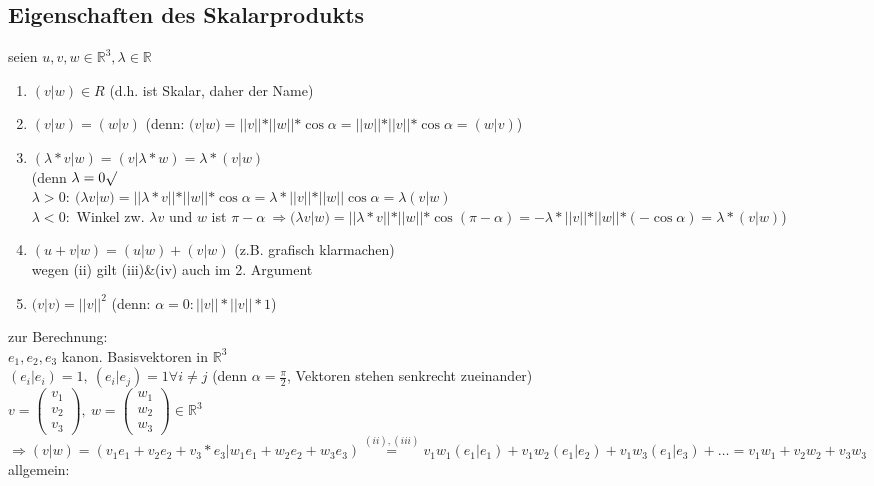\subsection{Eigenschaften des Skalarprodukts}
seien $u,v,w \in \mathbb{R}^3, \lambda\in \mathbb{R}$
\begin{enumerate}
	\item $(v|w)\in R$ (d.h. ist Skalar, daher der Name)
	\item $(v|w)=(w|v)$ (denn: $(v|w)=||v||*||w||*\cos \alpha = ||w||*||v||*\cos\alpha = (w|v)$)
	\item $(\lambda*v|w)=(v|\lambda*w) = \lambda*(v|w)$\\
	(denn $\lambda=0 \surd$\\
	$\lambda >0: \ (\lambda v|w)=||\lambda*v||*||w||*\cos \alpha=\lambda*||v||*||w||\cos\alpha = \lambda(v|w)$\\
	$\lambda <0:$ Winkel zw. $\lambda v$ und $w$ ist $\pi -\alpha \ \Rightarrow (\lambda v|w)=||\lambda*v||*||w||*\cos(\pi-\alpha) = -\lambda*||v||*||w||*(-\cos \alpha) = \lambda*(v|w)$)
	\item $(u+v|w)=(u|w)+(v|w)$ (z.B. grafisch klarmachen)\\
	wegen (ii) gilt (iii)\&(iv) auch im 2. Argument
	
	\item $(v|v)=||v||^2$ (denn: $\alpha =0: ||v||*||v||*1$)
\end{enumerate}
zur Berechnung:\\
$e_1,e_2,e_3$ kanon. Basisvektoren in $\mathbb{R}^3$\\
$(e_i|e_i)=1, \ (e_i|e_j)=1 \forall i\neq j$ (denn $\alpha=\frac{\pi}{2}$, Vektoren stehen senkrecht zueinander)\\
$v=\begin{pmatrix}v_1 \\ v_2 \\ v_3\end{pmatrix}, \ w=\begin{pmatrix}w_1 \\ w_2 \\ w_3\end{pmatrix}\in \mathbb{R}^3$\\
$\Rightarrow (v|w)=(v_1e_1+v_2e_2+v_3*e_3 | w_1e_1+w_2e_2+w_3e_3) \stackrel{(ii),(iii)}{=} v_1w_1(e_1|e_1)+v_1w_2(e_1|e_2)+v_1w_3(e_1|e_3)+\dots = v_1w_1+v_2w_2+v_3w_3$\\
allgemein:


